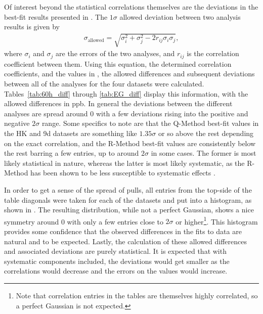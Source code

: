 Of interest beyond the statistical correlations themselves are the deviations in the best-fit \R results presented in . The $1\sigma$ allowed deviation between two analysis results is given by
\begin{align}
	\sigma_{\text{allowed}} = \sqrt{\sigma^{2}_{i} + \sigma^{2}_{j} - 2r_{ij}\sigma_{i}\sigma_{j}},
\end{align}
where $\sigma_{i}$ and $\sigma_{j}$ are the errors of the two analyses, and $r_{ij}$ is the correlation coefficient between them. Using this equation, the determined correlation coefficients, and the values in , the allowed differences and subsequent deviations between all of the analyses for the four datasets were calculated. Tables~\ref{tab:60h_diff} through \ref{tab:EG_diff} display this information, with the allowed differences in ppb. In general the deviations between the different analyses are spread around 0 with a few deviations rising into the positive and negative $2\sigma$ range. Some specifics to note are that the Q-Method best-fit \R values in the HK and 9d datasets are something like $1.35\sigma$ or so above the rest depending on the exact correlation, and the R-Method best-fit \R values are consistently below the rest barring a few entries, up to around $2\sigma$ in some cases. The former is most likely statistical in nature, whereas the latter is most likely systematic, as the R-Method has been shown to be less susceptible to systematic effects \cite{phdthesis:2020Kinnaird}.

In order to get a sense of the spread of pulls, all entries from the top-side of the table diagonals were taken for each of the datasets and put into a histogram, as shown in . The resulting distribution, while not a perfect Gaussian, shows a nice symmetry around 0 with only a few entries close to $2\sigma$ or higher\footnote{Note that correlation entries in the tables are themselves highly correlated, so a perfect Gaussian is not expected.}. This histogram provides some confidence that the observed differences in the fits to data are natural and to be expected. Lastly, the calculation of these allowed differences and associated deviations are purely statistical. It is expected that with systematic components included, the deviations would get smaller as the correlations would decrease and the errors on the \R values would increase.


